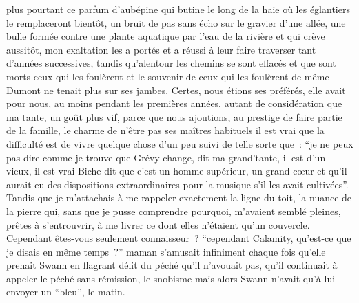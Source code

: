 \documentclass{article}
\begin{document}
plus pourtant ce parfum d'aubépine qui butine le long de la haie où les églantiers le remplaceront bientôt, un bruit de pas sans écho sur le gravier d'une allée, une bulle formée contre une plante aquatique par l'eau de la rivière et qui crève aussitôt, mon exaltation les a portés et a réussi à leur faire traverser tant d'années successives, tandis qu'alentour les chemins se sont effacés et que sont morts ceux qui les foulèrent et le souvenir de ceux qui les foulèrent de même Dumont ne tenait plus sur ses jambes. Certes, nous étions ses préférés, elle avait pour nous, au moins pendant les premières années, autant de considération que ma tante, un goût plus vif, parce que nous ajoutions, au prestige de faire partie de la famille, le charme de n'être pas ses maîtres habituels il est vrai que la difficulté est de vivre quelque chose d'un peu suivi de telle sorte que~: ``je ne peux pas dire comme je trouve que Grévy change, dit ma grand'tante, il est d'un vieux, il est vrai Biche dit que c'est un homme supérieur, un grand cœur et qu'il aurait eu des dispositions extraordinaires pour la musique s'il les avait cultivées''. Tandis que je m'attachais à me rappeler exactement la ligne du toit, la nuance de la pierre qui, sans que je pusse comprendre pourquoi, m'avaient semblé pleines, prêtes à s'entrouvrir, à me livrer ce dont elles n'étaient qu'un couvercle. Cependant êtes-vous seulement connaisseur~? ``cependant Calamity, qu'est-ce que je disais en même temps~?'' maman s'amusait infiniment chaque fois qu'elle prenait Swann en flagrant délit du péché qu'il n'avouait pas, qu'il continuait à appeler le péché sans rémission, le snobisme mais alors Swann n'avait qu'à lui envoyer un ``bleu'', le matin.
			\newpage
\end{document}

